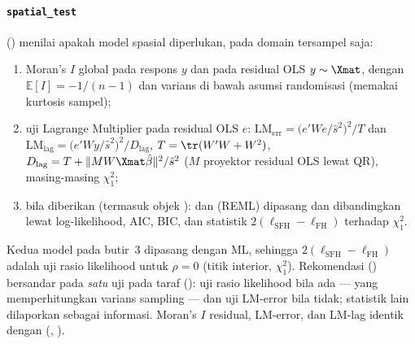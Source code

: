 \paragraph{\texttt{spatial\_test}} () menilai apakah
model spasial diperlukan, pada domain tersampel saja:
\begin{enumerate}[label=\arabic*.]
  \item Moran's $I$ global pada respons $y$ dan pada residual OLS
        $y\sim\Xmat$, dengan $\mathbb E[I]=-1/(n-1)$ dan varians di bawah
        asumsi randomisasi (memakai kurtosis sampel);
  \item uji Lagrange Multiplier \citet{anselin1988spatial} pada residual OLS
        $e$:
        $\mathrm{LM}_{\text{err}}=\bigl(e'We/\hat s^2\bigr)^2/T$ dan
        $\mathrm{LM}_{\text{lag}}=\bigl(e'Wy/\hat s^2\bigr)^2/D_{\text{lag}}$,
        $T=\tr(W'W+W^2)$, $D_{\text{lag}}=T+\lVert M W\Xmat\hat\beta\rVert^2/\hat s^2$
        ($M$ proyektor residual OLS lewat QR), masing-masing $\chi^2_1$;
  \item bila  diberikan (termasuk objek ):
         dan  (REML) dipasang dan dibandingkan
        lewat log-likelihood, AIC, BIC, dan statistik
        $2(\ell_{\text{SFH}}-\ell_{\text{FH}})$ terhadap $\chi^2_1$.
\end{enumerate}
Kedua model pada butir~3 dipasang dengan ML, sehingga
$2(\ell_{\text{SFH}}-\ell_{\text{FH}})$ adalah uji rasio likelihood untuk
$\rho=0$ (titik interior, $\chi^2_1$). Rekomendasi
() bersandar pada \emph{satu} uji pada taraf
 (): uji rasio likelihood bila 
ada --- yang memperhitungkan varians sampling --- dan uji LM-error bila tidak;
statistik lain dilaporkan sebagai informasi. Moran's $I$ residual, LM-error,
dan LM-lag identik dengan  (, ).

